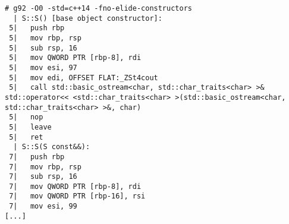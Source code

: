 \begin{lstlisting}[language={},numbers=none,title=\href{https://godbolt.org/z/BlDBke}{\texttt{godbolt.org/z/BlDBke}}]
# g92 -O0 -std=c++14 -fno-elide-constructors
  | S::S() [base object constructor]:
 5|   push rbp
 5|   mov rbp, rsp
 5|   sub rsp, 16
 5|   mov QWORD PTR [rbp-8], rdi
 5|   mov esi, 97
 5|   mov edi, OFFSET FLAT:_ZSt4cout
 5|   call std::basic_ostream<char, std::char_traits<char> >& std::operator<< <std::char_traits<char> >(std::basic_ostream<char, std::char_traits<char> >&, char)
 5|   nop
 5|   leave
 5|   ret
  | S::S(S const&&):
 7|   push rbp
 7|   mov rbp, rsp
 7|   sub rsp, 16
 7|   mov QWORD PTR [rbp-8], rdi
 7|   mov QWORD PTR [rbp-16], rsi
 7|   mov esi, 99
[...]
\end{lstlisting}
